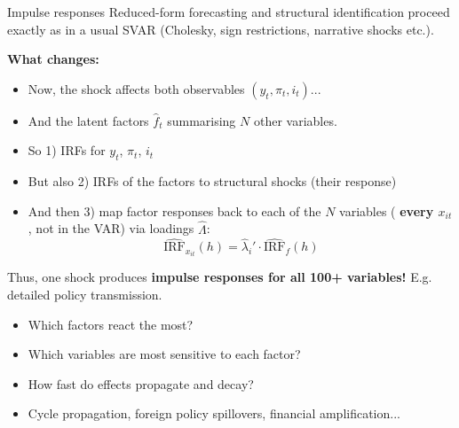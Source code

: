 \documentclass{beamer}
\begin{document}
\begin{frame}{Impulse responses}
\footnotesize
Reduced-form forecasting and structural identification proceed exactly as in a usual SVAR (Cholesky, sign restrictions, narrative shocks etc.).

\medskip
\textbf{What changes:}
\begin{itemize}
  \item Now, the shock affects both observables $(y_t,\pi_t,i_t)$...
  \item And the latent factors $\hat{f}_t$ summarising $N$ other variables.
\end{itemize}

\medskip
\begin{itemize}
    \item  So 1) IRFs for $y_t$, $\pi_t$, $i_t$
    \item  But also 2) IRFs of the factors to structural shocks (their response)
    \item And then 3) map factor responses back to each of the $N$ variables ( \textbf{every $x_{it}$}, not in the VAR) via loadings $\hat{\Lambda}$:
\[
\widehat{\text{IRF}}_{x_{it}}(h)
    = \hat{\lambda}_i' \cdot \widehat{\text{IRF}}_{f}(h)
\]
\end{itemize}
Thus, one shock produces \textbf{impulse responses for all 100+ variables!} E.g. detailed policy transmission. 

\begin{itemize}
    \item Which factors react the most?
    \item Which variables are most sensitive to each factor?
    \item How fast do effects propagate and decay?
    \item Cycle propagation, foreign policy spillovers, financial amplification...
\end{itemize}
\end{frame}
\end{document}
